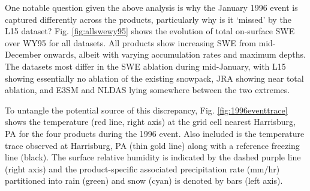 \documentclass[nhess, manuscript]{copernicus}
\begin{document}

One notable question given the above analysis is why the January 1996 event is captured differently across the products, particularly why is it `missed' by the L15 dataset?
Fig. \ref{fig:allswewy95} shows the evolution of total on-surface SWE over WY95 for all datasets.
All products show increasing SWE from mid-December onwards, albeit with varying accumulation rates and maximum depths.
The datasets most differ in the SWE ablation during mid-January, with L15 showing essentially no ablation of the existing snowpack, JRA showing near total ablation, and E3SM and NLDAS lying somewhere between the two extremes.

To untangle the potential source of this discrepancy, Fig. \ref{fig:1996eventtrace} shows the temperature (red line, right axis) at the grid cell nearest Harrisburg, PA for the four products during the 1996 event.
Also included is the temperature trace observed at Harrisburg, PA (thin gold line) along with a reference freezing line (black). The surface relative humidity is indicated by the dashed purple line (right axis) and the product-specific associated precipitation rate (mm/hr) partitioned into rain (green) and snow (cyan) is denoted by bars (left axis).

\end{document}
